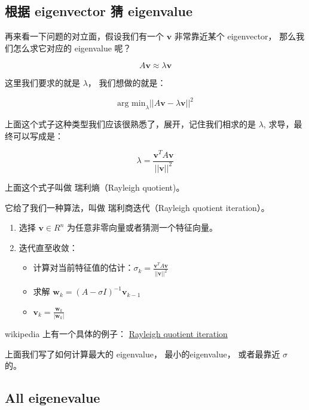 \documentclass[
]{book}
\providecommand{\tightlist}{%
  \setlength{\itemsep}{0pt}\setlength{\parskip}{0pt}}
\begin{document}
\hypertarget{ux6839ux636e-eigenvector-ux731c-eigenvalue}{%
\subsection{根据 eigenvector 猜 eigenvalue}\label{ux6839ux636e-eigenvector-ux731c-eigenvalue}}

再来看一下问题的对立面，假设我们有一个 \(\mathbf{v}\) 非常靠近某个 eigenvector， 那么我们怎么求它对应的 eigenvalue 呢？

\[A\mathbf{v} \approx \lambda \mathbf{v}\]

这里我们要求的就是 \(\lambda\)， 我们想做的就是：

\[
\text{arg min}_{\lambda}||A\mathbf{v} - \lambda \mathbf{v}||^2
\]

上面这个式子这种类型我们应该很熟悉了，展开，记住我们相求的是 \(\lambda\), 求导，最终可以写成是：

\[
\lambda = \frac{\mathbf{v}^T A \mathbf{v}}{||\mathbf{v}||^2}
\]

上面这个式子叫做 瑞利熵（Rayleigh quotient)。

它给了我们一种算法，叫做 瑞利商迭代（Rayleigh quotient iteration）。

\begin{enumerate}
\def\labelenumi{\arabic{enumi}.}
\item
  选择 \(\mathbf{v} \in R^n\) 为任意非零向量或者猜测一个特征向量。
\item
  迭代直至收敛：

  \begin{itemize}
  \tightlist
  \item
    计算对当前特征值的估计：\(\sigma_k = \frac{\mathbf{v}^T A \mathbf{v}}{||\mathbf{v}||^2}\)
  \item
    求解 \(\mathbf{w}_k = (A - \sigma I)^{-1} \mathbf{v}_{k-1}\)\\
  \item
    \(\mathbf{v}_k = \frac{\mathbf{w}_k}{|\mathbf{w}_k|}\)
  \end{itemize}
\end{enumerate}

wikipedia 上有一个具体的例子： \href{}{Rayleigh quotient iteration}

上面我们写了如何计算最大的 eigenvalue， 最小的eigenvalue， 或者最靠近 \(\sigma\) 的。

\hypertarget{all-eigenevalue}{%
\subsection{All eigenevalue}\label{all-eigenevalue}}
\end{document}
